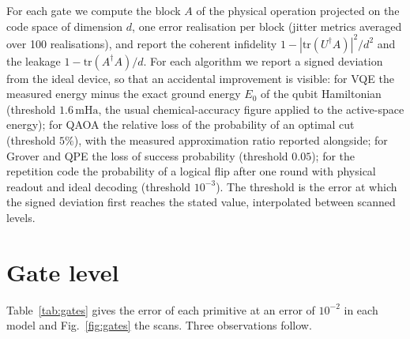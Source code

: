 \documentclass[reprint,aps,pra,amsmath,amssymb,superscriptaddress,letterpaper]{revtex4-2}
\begin{document}
For each gate we compute the block $A$ of the physical operation projected on
the code space of dimension $d$, one error realisation per block (jitter
metrics averaged over 100 realisations), and report the coherent infidelity
$1-|\mathrm{tr}(U^\dagger A)|^2/d^2$ and the leakage $1-\mathrm{tr}(A^\dagger A)/d$.
For each algorithm we report a signed deviation from the ideal device, so
that an accidental improvement is visible: for VQE the measured energy minus
the exact ground energy $E_0$ of the qubit Hamiltonian (threshold
$1.6\,\mathrm{mHa}$, the usual chemical-accuracy figure applied to the
active-space energy); for QAOA the relative loss of the probability of an
optimal cut (threshold $5\%$), with the measured approximation ratio reported
alongside; for Grover and QPE the loss of success probability (threshold
$0.05$); for the repetition code the probability of a logical flip after one
round with physical readout and ideal decoding (threshold $10^{-3}$). The
threshold is the error at which the signed deviation first reaches the stated
value, interpolated between scanned levels.

\section{Gate level}
\label{sec:gates}

Table~\ref{tab:gates} gives the error of each primitive at an error of $10^{-2}$ in each model and
Fig.~\ref{fig:gates} the scans. Three observations follow.
\end{document}
